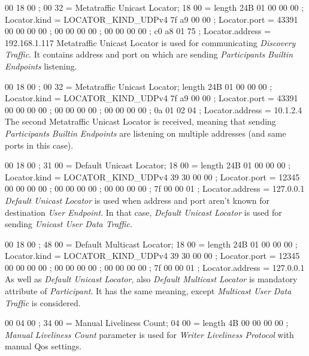  00 18 00  ; 00 32 = Metatraffic Unicast Locator; 18 00 = length 24B
 01 00 00 00  ; Locator.kind = LOCATOR_KIND_UDPv4
 7f a9 00 00  ; Locator.port = 43391
 00 00 00 00  ;
 00 00 00 00  ;
 00 00 00 00  ;
 c0 a8 01 75  ; Locator.address = 192.168.1.117
\endtt
Metatraffic Unicast Locator is used for communicating {\em Discovery Traffic}. It contains  address and port on which are sending {\em Participants} {\em Builtin Endpoints} listening.

 00 18 00  ; 00 32 = Metatraffic Unicast Locator; length 24B
 01 00 00 00  ; Locator.kind = LOCATOR_KIND_UDPv4
 7f a9 00 00  ; Locator.port = 43391
 00 00 00 00  ;
 00 00 00 00  ;
 00 00 00 00  ;
 0a 01 02 04  ; Locator.address = 10.1.2.4
\endtt
The second Metatraffic Unicast Locator is received, meaning that sending {\em Participants} {\em Builtin Endpoints} are listening on multiple  addresses (and same ports in this case).

 00 18 00  ; 31 00 = Default Unicast Locator; 18 00 = length 24B
 01 00 00 00  ; Locator.kind = LOCATOR_KIND_UDPv4
 39 30 00 00  ; Locator.port = 12345
 00 00 00 00  ;
 00 00 00 00  ;
 00 00 00 00  ;
 7f 00 00 01  ; Locator.address = 127.0.0.1
\endtt
{\em Default Unicast Locator} is used when  address and port aren't known for destination {\em User Endpoint}. In that case, {\em Default Unicast Locator} is used for sending {\em Unicast User Data Traffic}.

 00 18 00  ; 48 00 = Default Multicast Locator; 18 00 = length 24B
 01 00 00 00  ; Locator.kind = LOCATOR_KIND_UDPv4
 39 30 00 00  ; Locator.port = 12345
 00 00 00 00  ;
 00 00 00 00  ;
 00 00 00 00  ;
 7f 00 00 01  ; Locator.address = 127.0.0.1
\endtt
As well as {\em Default Unicast Locator}, also {\em Default Multicast Locator} is mandatory attribute of {\em Participant}. It has the same meaning, except {\em Multicast User Data Traffic} is considered. 

 00 04 00  ; 34 00 = Manual Liveliness Count; 04 00 = length 4B
 00 00 00 00  ;
\endtt
{\em Manual Liveliness Count} parameter is used for {\em Writer Liveliness Protocol} with manual Qos settings.

